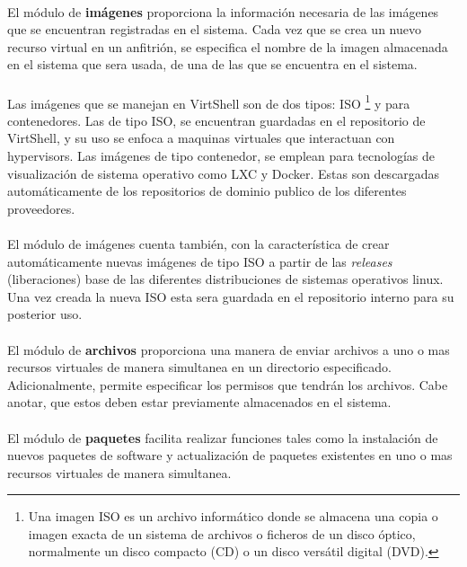 \\
El módulo de \textbf{imágenes} proporciona la información necesaria de las imágenes que se encuentran registradas en el sistema. Cada vez que se crea un nuevo recurso virtual en un anfitrión, se especifica el nombre de la imagen almacenada en el sistema que sera usada, de una de las que se encuentra en el sistema. \\
\\
Las imágenes que se manejan en VirtShell son de dos tipos: ISO \footnote{Una imagen ISO es un archivo informático donde se almacena una copia o imagen exacta de un sistema de archivos o ficheros de un disco óptico, normalmente un disco compacto (CD) o un disco versátil digital (DVD).} y para contenedores. Las de tipo ISO, se encuentran guardadas en el repositorio de VirtShell, y su uso se enfoca a maquinas virtuales que interactuan con hypervisors. Las imágenes de tipo contenedor, se emplean para tecnologías de visualización de sistema operativo como LXC y Docker. Estas son descargadas automáticamente de los repositorios de dominio publico de los diferentes proveedores. \\
\\
El módulo de imágenes cuenta también, con la característica de crear automáticamente nuevas imágenes de tipo ISO a partir de las \emph{releases} (liberaciones) base de las diferentes distribuciones de sistemas operativos linux. Una vez creada la nueva ISO esta sera guardada en el repositorio interno para su posterior uso.\\
\\
El módulo de \textbf{archivos} proporciona una manera de enviar archivos a uno o mas recursos virtuales de manera simultanea en un directorio especificado. Adicionalmente, permite especificar los permisos que tendrán los archivos. Cabe anotar, que  estos deben estar previamente almacenados en el sistema.\\
\\
El módulo de \textbf{paquetes} facilita realizar funciones tales como la instalación de nuevos paquetes de software y actualización de paquetes existentes en uno o mas recursos virtuales de manera simultanea.


